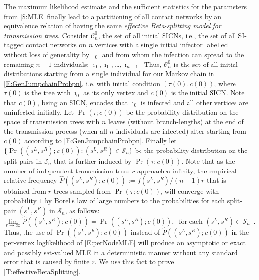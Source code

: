 \documentclass[review]{elsarticle}
\numberwithin{equation}{section}
\let\orgautoref\autoref
\renewcommand{\autoref}
        {\def\equationautorefname{Eq.}%
         \def\figureautorefname{Fig.}%
         \def\subfigureautorefname{Fig.}%
         \def\sectionautorefname{Sect.}%
         \def\subsectionautorefname{Sect.}%
         \def\subsubsectionautorefname{Sect.}%
         \def\Itemautorefname{item}%
         \def\tableautorefname{Table}%
         \def\propositionautorefname{Prop.}%
         \def\corollaryautorefname{Corollary}%
         \def\theoremautorefname{Theorem}%
         \def\remarkautorefname{Remark}%
         \def\lemmaautorefname{Lemma}%
         \def\proofofautorefname{Proof}%
         \def\exampleautorefname{Example}%
         \orgautoref}
\begin{document}
The maximum likelihood estimate and the sufficient statistics for the parameters from \autoref{S:MLE} finally lead to a partitioning of all contact networks by an equivalence relation of having the same {\em effective Beta-splitting model for transmission trees}. 
Consider $\mathcal{C}_n^0$, the set of all initial SICNs, i.e., the set of all SI-tagged contact networks on $n$ vertices with a single initial infector labelled without loss of generality by $\imath_0$ and from whom the infection can spread to the remaining $n-1$ individuals: $\imath_0,\imath_1,\ldots,\imath_{n-1}$.  
Thus, $\mathcal{C}_n^0$ is the set of all initial distributions starting from a single individual for our Markov chain in \ref{E:GenJumpchainProbpn}, 
i.e. with initial condition $(\tau(0),c(0))$, where $\tau(0)$ is the tree with $\imath_0$ as its only vertex and $c(0)$ is the initial SICN.  
Note that $c(0)$, being an SICN, encodes that $\imath_0$ is infected and all other vertices are uninfected initially.
Let $\Pr(\tau; c(0))$ be the probability distribution on the space of transmission trees with $n$ leaves (without branch-lengths) at the end of the transmission process (when all $n$ individuals are infected) after starting from $c(0)$ according to \ref{E:GenJumpchainProbpn}.  
Finally let $\{\Pr((s^L,s^R); c(0)) : (s^L,s^R) \in \mathcal{S}_n\}$ be the probability distribution on the split-pairs in $\mathcal{S}_n$ that is further induced by $\Pr(\tau; c(0))$.  
Note that as the number of independent transmission trees $r$ approaches infinity, 
the empirical relative frequency $\hat{P}((s^L,s^R); c(0)):=f(s^L,s^R)/(n-1)r$ that is 
obtained from $r$ trees sampled from $\Pr(\tau; c(0))$, 
will converge with probability $1$ by Borel's law of large numbers to the probabilities for each split-pair $(s^L,s^R)$ in $\mathcal{S}_n$, 
as follows:
\[
\lim_{r\to\infty} \hat{P}((s^L,s^R); c(0)) = \Pr((s^L,s^R); c(0)) , \ \text{ for each } (s^L,s^R) \in \mathcal{S}_n \enspace.
\]
Thus, the use of $\Pr((s^L,s^R); c(0))$ instead of $\hat{P}((s^L,s^R); c(0))$ in the per-vertex loglikelihood of \autoref{E:perNodeMLE} will produce an asymptotic or exact and possibly set-valued MLE in a deterministic manner without any standard error that is caused by finite $r$.  
We use this fact to prove \autoref{T:effectiveBetaSplitting}.
\end{document}
